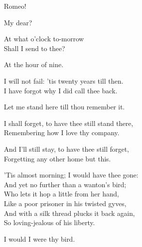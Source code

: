 \begin{speech}
Romeo! \\
\end{speech}
\begin{speech}
My dear? \\
\end{speech}
\begin{speech}
At what o'clock to-morrow \\
Shall I send to thee? \\
\end{speech}
\begin{speech}
At the hour of nine. \\
\end{speech}
\begin{speech}
I will not fail: 'tis twenty years till then. \\
I have forgot why I did call thee back. \\
\end{speech}
\begin{speech}
Let me stand here till thou remember it. \\
\end{speech}
\begin{speech}
I shall forget, to have thee still stand there, \\

Remembering how I love thy company. \\
\end{speech}
\begin{speech}
And I'll still stay, to have thee still forget, \\

Forgetting any other home but this. \\
\end{speech}
\begin{speech}
'Tis almost morning; I would have thee gone: \\
And yet no further than a wanton's bird; \\
Who lets it hop a little from her hand, \\
Like a poor prisoner in his twisted gyves, \\
And with a silk thread plucks it back again, \\
So loving-jealous of his liberty. \\
\end{speech}
\begin{speech}
I would I were thy bird. \\
\end{speech}

